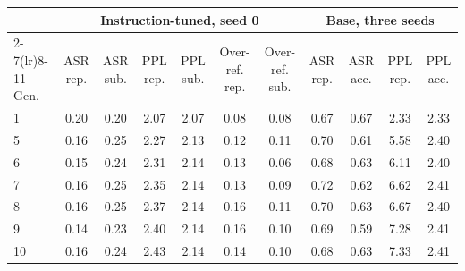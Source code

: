 \begin{tabular}{lcccccccccc}
\toprule
 & \multicolumn{6}{c}{Instruction-tuned, seed 0} & \multicolumn{4}{c}{Base, three seeds} \\
\cmidrule(lr){2-7}\cmidrule(lr){8-11}
Gen. & ASR rep. & ASR sub. & PPL rep. & PPL sub. & Over-ref. rep. & Over-ref. sub. & ASR rep. & ASR acc. & PPL rep. & PPL acc. \\
\midrule
1 & 0.20 & 0.20 & 2.07 & 2.07 & 0.08 & 0.08 & 0.67 & 0.67 & 2.33 & 2.33 \\
5 & 0.16 & 0.25 & 2.27 & 2.13 & 0.12 & 0.11 & 0.70 & 0.61 & 5.58 & 2.40 \\
6 & 0.15 & 0.24 & 2.31 & 2.14 & 0.13 & 0.06 & 0.68 & 0.63 & 6.11 & 2.40 \\
7 & 0.16 & 0.25 & 2.35 & 2.14 & 0.13 & 0.09 & 0.72 & 0.62 & 6.62 & 2.41 \\
8 & 0.16 & 0.25 & 2.37 & 2.14 & 0.16 & 0.11 & 0.70 & 0.63 & 6.67 & 2.40 \\
9 & 0.14 & 0.23 & 2.40 & 2.14 & 0.16 & 0.10 & 0.69 & 0.59 & 7.28 & 2.41 \\
10 & 0.16 & 0.24 & 2.43 & 2.14 & 0.14 & 0.10 & 0.68 & 0.63 & 7.33 & 2.41 \\
\bottomrule
\end{tabular}

